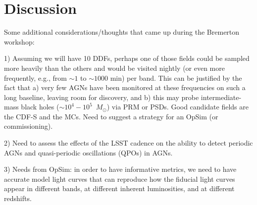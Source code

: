



%











\section{Discussion}
\label{sec:\secname:discussion}


Some additional considerations/thoughts that came up during the Bremerton
workshop:

1) Assuming we will have 10 DDFs, perhaps one of those fields could be
sampled more heavily than the others and would be visited nightly (or
even more frequently, e.g., from $\sim1$ to $\sim1000$ min) per band.
This can be justified by the fact that
a) very few AGNs have been monitored at these frequencies on such a
long baseline, leaving room for discovery, and b) this may probe
intermediate-mass black holes ($\sim10^4 - 10^5$~$M_{\odot}$) via PRM or
PSDs. Good candidate fields are the CDF-S and the MCs.
Need to suggest a strategy for an OpSim (or commissioning).

2) Need to assess the effects of the LSST cadence on the ability to
detect periodic AGNs and quasi-periodic oscillations (QPOs) in AGNs.

3) Needs from OpSim: in order to have informative metrics, we need to have
accurate model light curves that can reproduce how the fiducial light
curves appear in different bands, at different inherent luminosities,
and at different redshifts.

